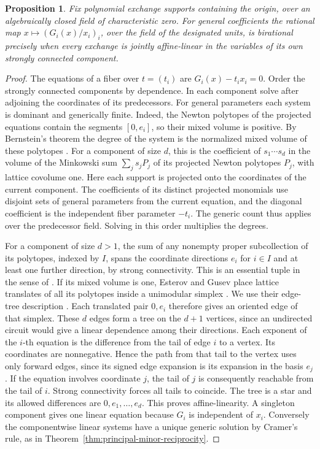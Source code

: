 \documentclass[11pt,reqno]{amsart}
\numberwithin{equation}{section}
\newtheorem{proposition}[theorem]{Proposition}
\theoremstyle{definition}
\theoremstyle{remark}
\begin{document}
\begin{proposition}\label{prop:ordinary-partner-degree}
Fix polynomial exchange supports containing the origin, over an
algebraically closed field of characteristic zero. For general
coefficients the rational map
\(x\mapsto(G_i(x)/x_i)_i\), over the field of the designated units,
is birational precisely when every exchange is jointly affine-linear
in the variables of its own strongly connected component.
\end{proposition}
\begin{proof}
The equations of a fiber over \(t=(t_i)\) are \(G_i(x)-t_i x_i=0\).
Order the strongly connected components by dependence. In each
component solve after adjoining the coordinates of its predecessors.
For general parameters each system is dominant and generically
finite. Indeed, the Newton polytopes of the projected equations
contain the segments \([0,e_i]\), so their mixed volume is positive.
By Bernstein's theorem the degree of the system is the normalized
mixed volume of these polytopes \cite{Bernstein}. For a component of
size \(d\), this is the coefficient of \(s_1\cdots s_d\) in the
volume of the Minkowski sum \(\sum_j s_j P_j\) of its projected
Newton polytopes \(P_j\), with lattice covolume one. Here each support
is projected onto the coordinates of the current component. The coefficients of its distinct projected monomials
use disjoint sets of general parameters from the current
equation, and the diagonal coefficient is the independent fiber
parameter \(-t_i\). The generic count thus applies over the
predecessor field. Solving in this order multiplies the degrees.

For a component of size \(d>1\), the sum of any nonempty proper
subcollection of its polytopes, indexed by \(I\), spans the
coordinate directions \(e_i\) for \(i\in I\) and at least one
further direction, by strong connectivity. This is an essential
tuple in the sense of \cite{EG}. If its mixed volume is one,
Esterov and Gusev place lattice translates of all its polytopes
inside a unimodular simplex \cite[Theorem~2]{EG}. We use their
edge-tree description \cite[Proposition~3]{EG}. Each translated pair
\(0,e_i\) therefore gives an oriented edge of that simplex.
These \(d\) edges form a tree on the \(d+1\) vertices, since an
undirected circuit would give a linear dependence among their
directions. Each exponent of the \(i\)-th equation is the
difference from the tail of edge \(i\) to a vertex. Its coordinates
are nonnegative. Hence the path from that tail to the vertex
uses only forward edges, since its signed edge expansion is its
expansion in the basis \(e_j\). If the equation involves
coordinate \(j\), the tail of \(j\) is consequently reachable from
the tail of \(i\). Strong connectivity forces all tails to
coincide. The tree is a star and its allowed differences are
\(0,e_1,\ldots,e_d\). This proves affine-linearity. A singleton
component gives one linear equation because \(G_i\) is independent
of \(x_i\). Conversely the componentwise linear systems have a
unique generic solution by Cramer's rule, as in
Theorem~\ref{thm:principal-minor-reciprocity}.
\end{proof}
\end{document}
